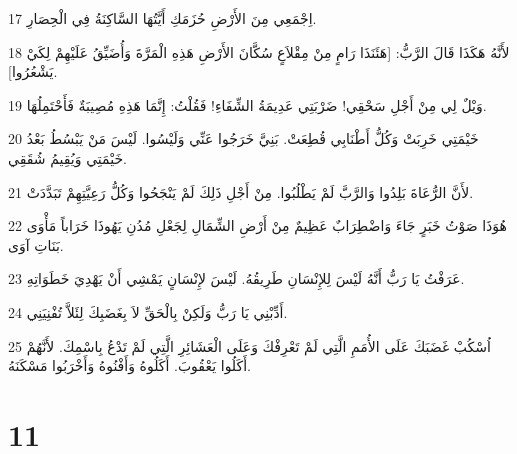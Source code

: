 \par 17 اِجْمَعِي مِنَ الأَرْضِ حُزَمَكِ أَيَّتُهَا السَّاكِنَةُ فِي الْحِصَارِ.
\par 18 لأَنَّهُ هَكَذَا قَالَ الرَّبُّ: [هَئَنَذَا رَامٍ مِنْ مِقْلاَعٍ سُكَّانَ الأَرْضِ هَذِهِ الْمَرَّةَ وَأُضَيِّقُ عَلَيْهِمْ لِكَيْ يَشْعُرُوا].
\par 19 وَيْلٌ لِي مِنْ أَجْلِ سَحْقِي! ضَرْبَتِي عَدِيمَةُ الشِّفَاءِ! فَقُلْتُ: إِنَّمَا هَذِهِ مُصِيبَةٌ فَأَحْتَمِلُهَا.
\par 20 خَيْمَتِي خَرِبَتْ وَكُلُّ أَطْنَابِي قُطِعَتْ. بَنِيَّ خَرَجُوا عَنِّي وَلَيْسُوا. لَيْسَ مَنْ يَبْسُطُ بَعْدُ خَيْمَتِي وَيُقِيمُ شُقَقِي.
\par 21 لأَنَّ الرُّعَاةَ بَلِدُوا وَالرَّبَّ لَمْ يَطْلُبُوا. مِنْ أَجْلِ ذَلِكَ لَمْ يَنْجَحُوا وَكُلُّ رَعِيَّتِهِمْ تَبَدَّدَتْ.
\par 22 هُوَذَا صَوْتُ خَبَرٍ جَاءَ وَاضْطِرَابٌ عَظِيمٌ مِنْ أَرْضِ الشِّمَالِ لِجَعْلِ مُدُنِ يَهُوذَا خَرَاباً مَأْوَى بَنَاتِ آوَى.
\par 23 عَرَفْتُ يَا رَبُّ أَنَّهُ لَيْسَ لِلإِنْسَانِ طَرِيقُهُ. لَيْسَ لإِنْسَانٍ يَمْشِي أَنْ يَهْدِيَ خَطَوَاتِهِ.
\par 24 أَدِّبْنِي يَا رَبُّ وَلَكِنْ بِالْحَقِّ لاَ بِغَضَبِكَ لِئَلاَّ تُفْنِيَنِي.
\par 25 اُسْكُبْ غَضَبَكَ عَلَى الأُمَمِ الَّتِي لَمْ تَعْرِفْكَ وَعَلَى الْعَشَائِرِ الَّتِي لَمْ تَدْعُ بِاسْمِكَ. لأَنَّهُمْ أَكَلُوا يَعْقُوبَ. أَكَلُوهُ وَأَفْنُوهُ وَأَخْرَبُوا مَسْكَنَهُ.

\chapter{11}

